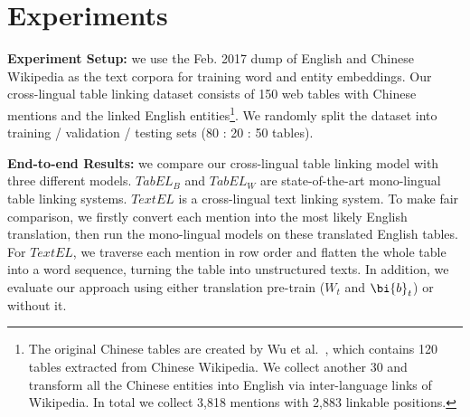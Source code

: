 \section{Experiments}
\label{sec:eval}



\noindent
\textbf{Experiment Setup:}
we use the Feb. 2017 dump of English and Chinese Wikipedia
as the text corpora for training word and entity embeddings.
Our cross-lingual table linking dataset consists of 150 web tables with Chinese mentions and
the linked English entities\footnote{
{\scriptsize The original Chinese tables are created by Wu et al.~, which contains 120 tables extracted from Chinese Wikipedia. We collect another 30 and transform all the Chinese entities into English via inter-language links of Wikipedia. In total we collect 3,818 mentions with 2,883 linkable positions.}}.
We randomly split the dataset into training / validation / testing sets (80 : 20 : 50 tables).

\noindent
\textbf{End-to-end Results:}
we compare our cross-lingual table linking model with three different models. 
$TabEL_B$ \cite{bhagavatula2015tabel} and $TabEL_W$ \cite{wu2016entity} are state-of-the-art mono-lingual table linking systems. $TextEL$ \cite{zhang2013cross} is a cross-lingual text linking system. To make fair comparison, we firstly convert each mention into the most likely English translation, then run the mono-lingual models on these translated English tables.
For $TextEL$, we traverse each mention in row order and flatten the whole table into a word sequence, turning the table into unstructured texts. In addition, we evaluate our approach using either translation pre-train ($W_t$ and $\bi{b}_t$) or without it.


